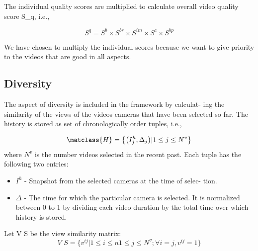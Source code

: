 \documentclass{sig-alternate}
\begin{document}
The individual quality scores are multiplied to calculate overall
video quality score S_q, i.e.,

\begin{equation}
S^q = S^b\times S^{br}\times S^{im}\times S^c\times S^{bp}
\end{equation}

We have chosen to multiply the individual scores because we
want to give priority to the videos that are good in all aspects.

\subsection{Diversity}
The aspect of diversity is included in the framework by calculat-
ing the similarity of the views of the videos cameras that have been selected
so far. The history is stored as set of chronologically order tuples,
i.e.,


\begin{equation}
\matclass{H} = \big\{\big(I_j^h,\Delta_j \big)|1\leq j\leq N^v\big\}
\end{equation}
where ${N^v}$ is the number videos selected in the recent past. Each
tuple has the following two entries:
\begin{itemize}
    \item ${I^h}$ - Snapshot from the selected cameras at the time of selec-
tion.
    \item $\Delta$ - The time for which the particular camera is selected. It
is normalized between 0 to 1 by dividing each video duration
by the total time over which history is stored.
\end{itemize}

Let V S be the view similarity matrix:
\begin{equation}
\textit{V S} = \big\{v^{ij}|1\leq i\leq n 1\leq j\leq N^v;\forall i=j,v^{ij}=1 \big\}
\end{equation}
\end{document}
